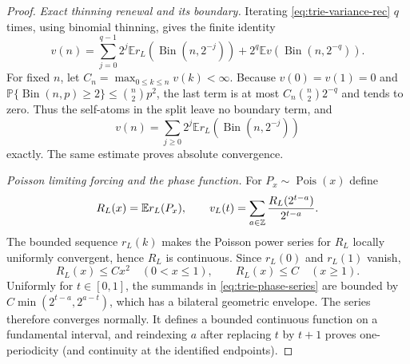 \documentclass[11pt]{article}
\numberwithin{equation}{section}
\newcommand{\1}{\mathbf 1}\newcommand{\F}{\mathcal F}\newcommand{\D}{\mathcal D}
\begin{document}
\begin{proof}
\emph{Exact thinning renewal and its boundary.}
Iterating \eqref{eq:trie-variance-rec} $q$ times, using binomial thinning,
gives the finite identity
\begin{equation}
 v(n)=\sum_{j=0}^{q-1}2^j\mathbb E r_L(\operatorname {Bin}(n,2^{-j}))
 +2^q\mathbb Ev(\operatorname {Bin}(n,2^{-q})).          \label{eq:trie-finite-renewal}
\end{equation}
For fixed $n$, let $C_n=\max_{0\le k\le n}v(k)<\infty$.  Because
$v(0)=v(1)=0$ and
$\mathbb P\{\operatorname {Bin}(n,p)\ge2\}\le {n\choose2}p^2$,
the last term is at most $C_n{n\choose2}2^{-q}$ and tends to zero.  Thus
the self-atoms in the split leave no boundary term, and
\begin{equation}
 v(n)=\sum_{j\ge0}2^j\mathbb E r_L(\operatorname {Bin}(n,2^{-j}))     \label{eq:trie-infinite-renewal}
\end{equation}
exactly.  The same estimate proves absolute convergence.

\emph{Poisson limiting forcing and the phase function.}
For $P_x\sim\operatorname {Pois}(x)$ define
\begin{equation}
 R_L(x)=\mathbb E r_L(P_x),\qquad
 v_L(t)=\sum_{a\in\mathbb Z}{R_L(2^{t-a})\over2^{t-a}}. \label{eq:trie-phase-series}
\end{equation}
The bounded sequence $r_L(k)$ makes the Poisson power series for $R_L$
locally uniformly convergent, hence $R_L$ is continuous.  Since $r_L(0)$
and $r_L(1)$ vanish,
\begin{equation}
 R_L(x)\le Cx^2\quad(0<x\le1),\qquad R_L(x)\le C\quad(x\ge1).          \label{eq:trie-poisson-bounds}
\end{equation}
Uniformly for $t\in[0,1]$, the summands in
\eqref{eq:trie-phase-series} are bounded by
$C\min(2^{t-a},2^{a-t})$, which has a bilateral geometric envelope.
The series therefore converges normally.  It defines a bounded continuous
function on a fundamental interval, and reindexing $a$ after replacing
$t$ by $t+1$ proves one-periodicity (and continuity at the identified
endpoints).


\end{proof}
\end{document}
